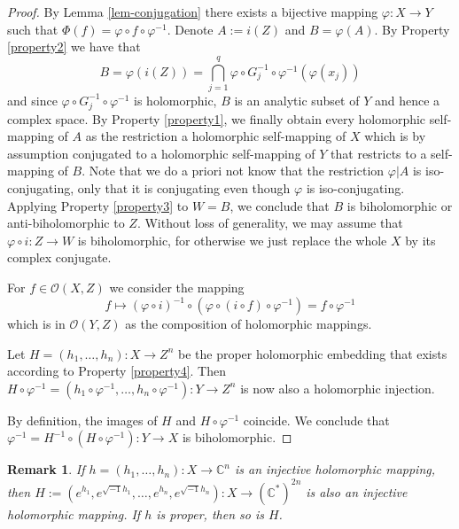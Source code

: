 \documentclass[a4paper,12pt]{amsart}
\newcommand{\CC}{\mathbb{C}}
\newcommand{\holo}{\mathcal{O}}
\newtheorem{remark}[theorem]{Remark}
\theoremstyle{definition}
\begin{document}
\begin{proof}
By Lemma \ref{lem-conjugation} there exists a bijective mapping $\varphi \colon X \to Y$ such that
$\Phi(f) = \varphi \circ f \circ \varphi^{-1}$. Denote $A := i(Z)$ and $B = \varphi(A)$. 
By Property \ref{property2} we have that
\[
B = \varphi(i(Z)) = \bigcap_{j=1}^{q} \varphi \circ G_j^{-1} \circ \varphi^{-1}( \varphi(x_j))
\]
and since $\varphi \circ G_j^{-1} \circ \varphi^{-1}$ is holomorphic, $B$ is an analytic subset of $Y$ and hence a complex space. By Property \ref{property1}, we finally obtain every holomorphic self-mapping of $A$ as the restriction a holomorphic self-mapping of $X$ which is by assumption conjugated to a holomorphic self-mapping of $Y$ that restricts to a self-mapping of $B$. Note that we do a priori not know that the restriction $\varphi | A$ is iso-conjugating, only that it is conjugating even though $\varphi$ is iso-conjugating. Applying Property \ref{property3} to $W = B$, we conclude that $B$ is biholomorphic or anti-biholomorphic to $Z$. Without loss of generality, we may assume that $\varphi \circ i \colon Z \to W$ is biholomorphic, for otherwise we just replace the whole $X$ by its complex conjugate.

For $f \in \holo(X, Z)$ we consider the mapping 
\[
f \mapsto (\varphi \circ i)^{-1} \circ (\varphi \circ (i \circ f) \circ \varphi^{-1}) = f \circ \varphi^{-1}
\]
which is in $\holo(Y, Z)$ as the composition of holomorphic mappings. 

Let $H = (h_1, \dots, h_n) \colon X \to Z^n$ be the proper holomorphic embedding that exists according to Property \ref{property4}. Then $H \circ \varphi^{-1} = (h_1 \circ \varphi^{-1}, \dots, h_n \circ \varphi^{-1}) \colon Y \to Z^n$ is now also a holomorphic injection. 

By definition, the images of $H$ and $H \circ \varphi^{-1}$ coincide. We conclude that $\varphi^{-1} = H^{-1} \circ (H \circ \varphi^{-1}) \colon Y \to X$ is biholomorphic. 
\end{proof}

\begin{remark}
\label{rem-CtoCstar}
If $h = (h_1, \dots, h_n) \colon X \to \CC^n$ is an injective holomorphic mapping, then 
$H := (e^{h_1}, e^{\sqrt{-1} h_1}, \dots, e^{h_n}, e^{\sqrt{-1} h_n}) \colon X \to (\CC^{\ast})^{2n}$ is also an injective holomorphic mapping. If $h$ is proper, then so is $H$.
\end{remark}
\end{document}

